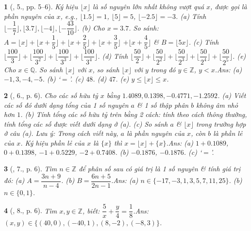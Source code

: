 \documentclass{article}
\newtheorem{baitoan}{}
\begin{document}
\begin{baitoan}[\cite{Binh_Toan_7_tap_1}, 5., pp. 5--6]
	Ký hiệu $\lfloor x\rfloor$ là số nguyên lớn nhất không vượt quá $x$, được gọi là \emph{phần nguyên} của $x$, e.g., $\lfloor 1.5\rfloor = 1$, $\lfloor 5\rfloor = 5$, $\lfloor -2.5\rfloor = -3$. (a) Tính $\lfloor-\dfrac{1}{7}\rfloor,\lfloor 3.7\rfloor,\lfloor-4\rfloor,\lfloor-\dfrac{43}{10}\rfloor$. (b) Cho $x = 3.7$. So sánh: $A = \lfloor x\rfloor + \lfloor x + \dfrac{1}{5}\rfloor + \lfloor x + \dfrac{2}{5}\rfloor + \lfloor x + \dfrac{3}{5}\rfloor$ $+ \lfloor x + \dfrac{4}{5}\rfloor$ \& $B = \lfloor 5x\rfloor$. (c) Tính $ \lfloor\dfrac{100}{3}\rfloor + \lfloor\dfrac{100}{3^2}\rfloor + \lfloor\dfrac{100}{3^3}\rfloor + \lfloor\dfrac{100}{3^4}\rfloor$. (d) Tính $ \lfloor\dfrac{50}{2}\rfloor + \lfloor\dfrac{50}{2^2}\rfloor + \lfloor\dfrac{50}{2^3}\rfloor + \lfloor\dfrac{50}{2^4}\rfloor + \lfloor\dfrac{50}{2^5}\rfloor$.  (e) Cho $x\in\mathbb{Q}$. So sánh $\lfloor x\rfloor$ với $x$, so sánh $\lfloor x\rfloor$ với $y$ trong đó $y\in\mathbb{Z}$, $y < x$.\hfill{\sf Ans: (a) $-1,3,-4,-5$. (b) `$=$'. (c) $48$. (d) $47$. (e) $y\le\lfloor x\rfloor\le x$.}
\end{baitoan}

\begin{baitoan}[\cite{Binh_Toan_7_tap_1}, 6., p. 6]
	Cho các số hữu tỷ $x$ bằng $1.4089, 0.1398, -0.4771, -1.2592$. (a) Viết các số đó dưới dạng tổng của 1 số nguyên $a$ \& 1 số thập phân $b$ không âm nhỏ hơn $1$. (b) Tính tổng các số hữu tỷ trên bằng 2 cách: tính theo cách thông thường, tính tổng các số được viết dưới dạng ở (a). (c) So sánh $a$ \& $\lfloor x\rfloor$ trong trường hợp ở câu (a). Lưu ý: Trong cách viết này, $a$ là \emph{phần nguyên} của $x$, còn $b$ là \emph{phần lẻ} của $x$. Ký hiệu phần lẻ của $x$ là $\{x\}$ thì $x = \lfloor x\rfloor + \{x\}$.\hfill{\sf Ans: (a) $1 + 0.1089$, $0 + 0.1398$, $-1 + 0.5229$, $-2 + 0.7408$. (b) $-0.1876$, $-0.1876$. (c) `$=$'.}
\end{baitoan}

\begin{baitoan}[\cite{Binh_Toan_7_tap_1}, 7., p. 6]
	Tìm $n\in\mathbb{Z}$ để phân số sau có giá trị là 1 số nguyên \& tính giá trị đó: (a) $A = \dfrac{3n + 9}{n - 4}$. (b) $B = \dfrac{6n + 5}{2n - 1}$.\hfill{\sf Ans: (a) $n\in\{-17,-3,1,3,5,7,11,25\}$. (b) $n\in\{0,1\}$.}
\end{baitoan}

\begin{baitoan}[\cite{Binh_Toan_7_tap_1}, 8., p. 6]
	Tìm $x,y\in\mathbb{Z}$, biết: $\dfrac{5}{x} + \dfrac{y}{4} = \dfrac{1}{8}$.\hfill{\sf Ans: $(x,y)\in\{(40,0),(-40,1),(8,-2),(-8,3)\}$.}
\end{baitoan}
\end{document}
